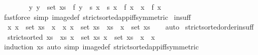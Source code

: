 \begin{isabellebody}
\ \ \ \ \ \ \ \ {\isacharparenleft}{\kern0pt}{\isasymAnd}y{\isachardot}{\kern0pt}\ y\ {\isasymin}\ set\ xs{}\ {\isasymLongrightarrow}\ f\ y\ {\isasymnotin}\ s{\isacharparenright}{\kern0pt}{\isacharsemicolon}{\kern0pt}\ x\ {\isasymin}\ s{\isacharsemicolon}{\kern0pt}\ x\ {\isacharless}{\kern0pt}\ f\ x{}{\isasymrbrakk}\ {\isasymLongrightarrow}\ x\ {\isacharequal}{\kern0pt}\ f\ x{}{\isachardoublequoteclose}\isanewline
%
\isadelimproof
\ \ %
\endisadelimproof
%
\isatagproof
{}\isamarkupfalse%
\ {\isacharparenleft}{\kern0pt}fastforce\ simp{\isacharcolon}{\kern0pt}\ image{\isacharunderscore}{\kern0pt}def\ strict{\isacharunderscore}{\kern0pt}sorted{\isacharunderscore}{\kern0pt}app{\isacharunderscore}{\kern0pt}iff{\isacharbrackleft}{\kern0pt}symmetric{\isacharbrackright}{\kern0pt}{\isacharparenright}{\kern0pt}%
\endisatagproof
{\isafoldproof}%
%
\isadelimproof
\isanewline
%
\endisadelimproof
\isanewline
{}\isamarkupfalse%
\ in{\isacharunderscore}{\kern0pt}suff{\isacharcolon}{\kern0pt}\isanewline
\ \ {\isachardoublequoteopen}{\isasymlbrakk}{\isasymAnd}x{\isachardot}{\kern0pt}\ x\ {\isasymin}\ set\ xs{}\ {\isasymLongrightarrow}\ x\ {\isasymnoteq}\ x{}{\isacharsemicolon}{\kern0pt}\ x{}\ {\isasymin}\ set\ {\isacharparenleft}{\kern0pt}xs{}\ {\isacharat}{\kern0pt}\ xs{}{\isacharparenright}{\kern0pt}{\isasymrbrakk}\ {\isasymLongrightarrow}\ x{}\ {\isasymin}\ set\ xs{}{\isachardoublequoteclose}\isanewline
%
\isadelimproof
\ \ %
\endisadelimproof
%
\isatagproof
{}\isamarkupfalse%
\ auto%
\endisatagproof
{\isafoldproof}%
%
\isadelimproof
\isanewline
%
\endisadelimproof
\isanewline
{}\isamarkupfalse%
\ strict{\isacharunderscore}{\kern0pt}sorted{\isacharunderscore}{\kern0pt}order{\isacharunderscore}{\kern0pt}in{\isacharunderscore}{\kern0pt}suff{\isacharcolon}{\kern0pt}\isanewline
\ \ {\isachardoublequoteopen}{\isasymlbrakk}strict{\isacharunderscore}{\kern0pt}sorted\ {\isacharparenleft}{\kern0pt}xs{}\ {\isacharat}{\kern0pt}\ xs{}{\isacharparenright}{\kern0pt}{\isacharsemicolon}{\kern0pt}\ x{}\ {\isasymin}\ set\ xs{}{\isacharsemicolon}{\kern0pt}\ x{}\ {\isasymin}\ set\ xs{}{\isasymrbrakk}\ {\isasymLongrightarrow}\ x{}\ {\isacharless}{\kern0pt}\ x{}{\isachardoublequoteclose}\isanewline
%
\isadelimproof
\ \ %
\endisadelimproof
%
\isatagproof
{}\isamarkupfalse%
\ {\isacharparenleft}{\kern0pt}induction\ xs{}{\isacharparenright}{\kern0pt}\ {\isacharparenleft}{\kern0pt}auto\ simp{\isacharcolon}{\kern0pt}\ image{\isacharunderscore}{\kern0pt}def\ strict{\isacharunderscore}{\kern0pt}sorted{\isacharunderscore}{\kern0pt}app{\isacharunderscore}{\kern0pt}iff{\isacharbrackleft}{\kern0pt}symmetric{\isacharbrackright}{\kern0pt}{\isacharparenright}{\kern0pt}%

\end{isabellebody}
